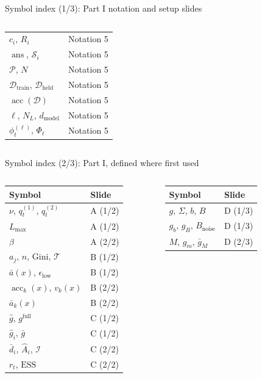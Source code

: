 \documentclass[aspectratio=169,11pt]{beamer}
\newcommand{\acc}{\operatorname{acc}}
\newcommand{\ans}{\operatorname{ans}}
\newcommand{\dm}{d_{\mathrm{model}}}
\begin{document}
\begin{frame}{Symbol index (1/3): Part I notation and setup slides}
\begin{columns}[T]
\begin{tabular}{@{}ll@{}}
$c_i$, $R_i$ & Notation 5\\
$\ans$, $\mathcal S_i$ & Notation 5\\
$\mathcal P$, $N$ & Notation 5\\
$\mathcal D_{\mathrm{train}}$, $\mathcal D_{\mathrm{held}}$ & Notation 5\\
$\acc(\mathcal D)$ & Notation 5\\
$\ell$, $N_L$, $\dm$ & Notation 5\\
$\phi^{(\ell)}_t$, $\Phi_\ell$ & Notation 5\\
\bottomrule
\end{tabular}
\end{columns}
\end{frame}

\begin{frame}{Symbol index (2/3): Part I, defined where first used}
\scriptsize
\setlength{\tabcolsep}{3pt}\renewcommand{\arraystretch}{1.15}
\begin{columns}[T]
\begin{tabular}{@{}ll@{}}
\toprule
\textbf{Symbol} & \textbf{Slide}\\ \midrule
$\nu$, $q^{(1)}_t$, $q^{(2)}_t$ & A (1/2)\\
$L_{\max}$ & A (1/2)\\
$\beta$ & A (2/2)\\
$a_j$, $n$, $\mathrm{Gini}$, $\mathcal T$ & B (1/2)\\
$\bar a(x)$, $\epsilon_{\mathrm{low}}$ & B (1/2)\\
$\acc_k(x)$, $v_k(x)$ & B (2/2)\\
$\bar a_k(x)$ & B (2/2)\\
$\hat g$, $g^{\mathrm{full}}$ & C (1/2)\\
$\hat g_i$, $\bar g$ & C (1/2)\\
$\bar d_i$, $\hat A_i$, $\mathcal I$ & C (2/2)\\
$r_t$, $\mathrm{ESS}$ & C (2/2)\\
\bottomrule
\end{tabular}
\begin{tabular}{@{}ll@{}}
\toprule
\textbf{Symbol} & \textbf{Slide}\\ \midrule
$g$, $\Sigma$, $b$, $B$ & D (1/3)\\
$g_b$, $g_B$, $B_{\mathrm{noise}}$ & D (1/3)\\
$M$, $g_m$, $\bar g_M$ & D (2/3)\\

\end{tabular}
\end{columns}
\end{frame}
\end{document}
